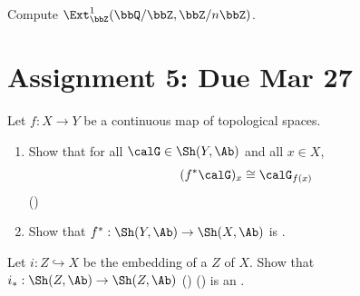 \begin{problem}
    Compute $\Ext_\bbZ^1(\bbQ / \bbZ, \bbZ / n \bbZ)$.
\end{problem}

\section{Assignment 5: Due Mar 27}

\begin{problem}
    Let $f: X \to Y$ be a continuous map of topological spaces. 
    \begin{enumerate}
        \item Show that for all $\calG \in \Sh(Y, \Ab)$ and all $x \in X$,  
        $$(f^{*} \calG)_x \cong \calG_{f(x)}$$
        ()

        \item Show that $f^*: \Sh(Y, \Ab) \to \Sh(X, \Ab)$ is .
    \end{enumerate}
\end{problem}

\begin{problem}
    Let $i: Z \hookrightarrow X$ be the embedding of a  $Z$ of $X$. Show that $i_*: \Sh(Z, \Ab) \to \Sh(Z, \Ab)$ () () is an .
\end{problem}


